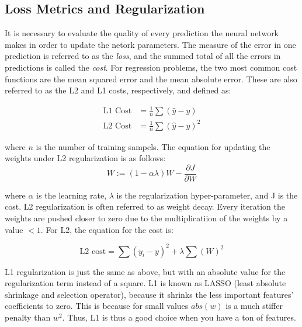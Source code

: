 \subsection{Loss Metrics and Regularization}
It is necessary to evaluate the quality of every prediction the neural network makes in order to update the netork parameters. The measure of the error in one prediction is referred to as the \textit{loss}, and the summed total of all the errors in predictions is called the \textit{cost}. For regression problems, the two most common cost functions are the mean squared error and the mean absolute error. These are also referred to as the L2 and L1 costs, respectively, and defined as:

\begin{align}
    \label{eqn:lossFunctions}
    \text{L1 Cost} &= \frac{1}{n} \sum \left( \hat{y} - y \right) \\
    \text{L2 Cost} &= \frac{1}{n} \sum \left( \hat{y} - y \right)^2
\end{align}

\noindent where $ n $ is the number of training sampels. The equation for updating the weights under L2 regularization is as follows:
\begin{equation}
    W := (1-\alpha \lambda)W - \frac{\partial J}{\partial W}  
\end{equation}

\noindent where $\alpha$ is the learning rate, $\lambda$ is the regularization hyper-parameter, and J is the cost. L2 regularization is often referred to as weight decay. Every iteration the weights are pushed closer to zero due to the multiplicatiion of the weights by a value $<1$. For L2, the equation for the cost is:

\begin{equation}
\text{L2 cost} = \sum (y_i - y)^2 + \lambda \sum (W)^2
\end{equation}

L1 regularization is just the same as above, but with an absolute value for the regularization term instead of a square. L1 is known as LASSO (least absolute shrinkage and selection operator), because it shrinks the less important features' coefficients to zero. This is because for small values $abs(w)$ is a much stiffer penalty than $w^2$. Thus, L1 is thus a good choice when you have a ton of features.




